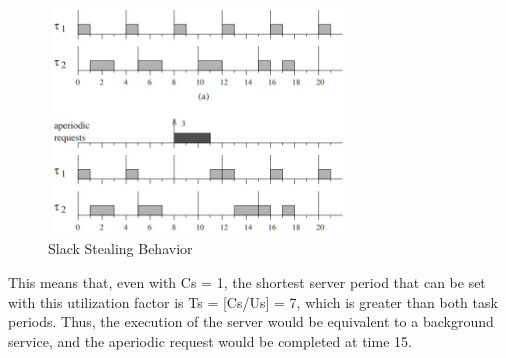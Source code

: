 \documentclass[conference]{IEEEtran}
\begin{document}
\begin{figure}[h!]
	\includegraphics[width=8cm, height=6cm]{behavior}
	\caption{Slack Stealing Behavior}
	\centering
\end{figure}

This means that, even with Cs = 1, the shortest server period that can be set with
this utilization factor is Ts = [Cs/Us] = 7, which is greater than both task periods.
Thus, the execution of the server would be equivalent to a background service, and the
aperiodic request would be completed at time 15.
\end{document}
